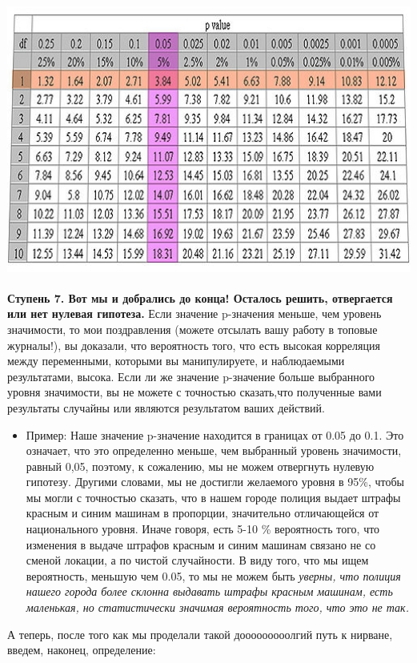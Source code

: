 \documentclass[final,pdftex]{../../template/epsilonj}
\numberwithin{equation}{section}
\begin{document}
\includegraphics[width=150mm,height=90mm]{6.jpg}

\textbf{Ступень 7. Вот мы и добрались до конца! Осталось решить, отвергается или нет нулевая гипотеза.} Если значение p-значения меньше, чем уровень значимости, то мои поздравления (можете отсылать вашу работу в топовые журналы!), вы доказали, что вероятность того, что есть высокая корреляция между переменными, которыми вы манипулируете, и наблюдаемыми результатами, высока. Если ли же значение p-значение больше выбранного уровня значимости, вы не можете с точностью сказать,что полученные вами результаты случайны или являются результатом ваших действий.

\begin{itemize}
	\item Пример: Наше значение p-значение находится в границах от 0.05 до 0.1. Это означает, что это определенно меньше, чем выбранный уровень значимости, равный 0,05, поэтому, к сожалению, мы не можем отвергнуть нулевую гипотезу. Другими словами, мы не достигли желаемого уровня в 95\%, чтобы мы могли с точностью сказать, что в нашем городе полиция выдает штрафы красным и синим машинам в пропорции, значительно отличающейся от национального уровня. Иначе говоря, есть 5-10 \% вероятность того, что изменения в выдаче штрафов красным и синим машинам связано не со сменой локации, а по чистой случайности. В виду того, что мы ищем вероятность, меньшую чем 0.05, то мы не можем быть \em{уверны}, что полиция нашего города более склонна выдавать штрафы красным машинам, есть маленькая, но статистически значимая вероятность того, что это не так.
\end{itemize}

А теперь, после того как мы проделали такой дооооооооолгий путь к нирване, введем, наконец, определение:
\end{document}
